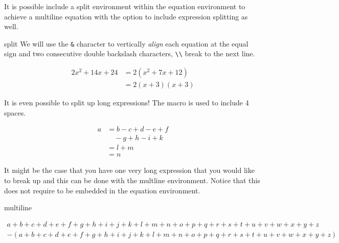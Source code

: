 It is possible include a split environment within the equation environment to achieve a
multiline equation with the option to include expression splitting as well.
\begin{docEnvironment*}[doclang/environment content=mathematics content goes here]{split}{}{}
  We will use the \verb!&! character to vertically \textit{align} each equation
  at the equal sign and two consecutive double backslash characters, \verb!\\! 
  break to the next line.
  \begin{dispExample}
    \begin{equation*}
      \begin{split}
        2x^2 + 14x + 24 
        &= 2( x^2 + 7x + 12 ) \\
        &= 2(x + 3)(x + 3) 
      \end{split}
    \end{equation*}
    \end{dispExample}
    It is even possible to split up long expressions!  The  macro is 
    used to include 4 spaces.
    \begin{dispExample}
      \begin{equation*}
        \begin{split}
          a
          &= b - c + d - e + f \\
          & \quad - g + h - i + k \\
          &= l + m \\
          &= n 
        \end{split}
      \end{equation*}
      \end{dispExample}
\end{docEnvironment*}
It might be the case that you have one very long expression that you would like 
to break up and this can be done with the multline environment.  Notice that 
this does not require to be embedded in the equation environment.
\begin{docEnvironment*}[doclang/environment content=mathematics content goes here]{multiline}{}{}
  \begin{dispExample}
    \begin{multline*}
        a + b + c + d + e + f + g + h + i + j + k + l + m + n + o + p + q + r + s + t + u + v + w + x + y + z \\
        - (a + b + c + d + e + f + g + h + i + j + k + l + m + n + o + p + q + r + s + t + u + v + w + x + y + z ) 
    \end{multline*}
    \end{dispExample}
\end{docEnvironment*}
